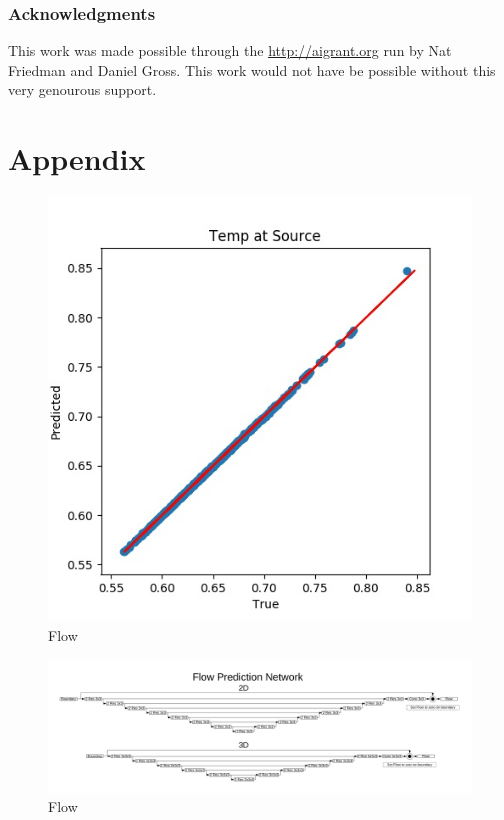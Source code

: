 \documentclass{article} %
\begin{document}
\subsubsection*{Acknowledgments}

This work was made possible through the \url{http://aigrant.org} run by Nat Friedman and Daniel Gross. This work would not have be possible without this very genourous support.




\section{Appendix}

\begin{figure}[h]
\begin{center}
\includegraphics[scale=0.15]{../test/figs/heat_accuracy.jpeg}
\end{center}
\caption{Flow}
\end{figure}


\begin{figure}[h]
\begin{center}
\includegraphics[scale=0.45]{./appendix_flow_net.pdf}
\end{center}
\caption{Flow}
\end{figure}
\end{document}
